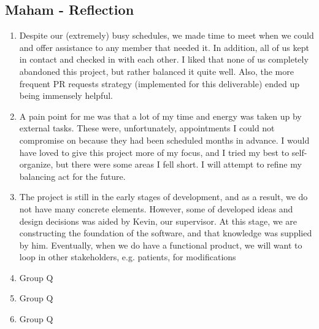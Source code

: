 \documentclass[12pt, titlepage]{article}
\begin{document}
\subsection*{Maham - Reflection}
\begin{enumerate}
  \item Despite our (extremely) busy schedules, we made time to meet when we could and offer assistance to any member that needed it. In addition, all of us kept in contact and checked in with each other. I liked that none of us completely abandoned this project, but rather balanced it quite well. Also, the more frequent PR requests strategy (implemented for this deliverable) ended up being immensely helpful.
  \item A pain point for me was that a lot of my time and energy was taken up by external tasks. These were, unfortunately, appointments I could not compromise on because they had been scheduled months in advance. I would have loved to give this project more of my focus, and I tried my best to self-organize, but there were some areas I fell short. I will attempt to refine my balancing act for the future.
  \item The project is still in the early stages of development, and as a result, we do not have many concrete elements. However, some of developed ideas and design decisions was aided by Kevin, our supervisor. At this stage, we are constructing the foundation of the software, and that knowledge was supplied by him. Eventually, when we do have a functional product, we will want to loop in other stakeholders, e.g. patients, for modifications
  \item Group Q
  \item Group Q
  \item Group Q
\end{enumerate}
\end{document}

